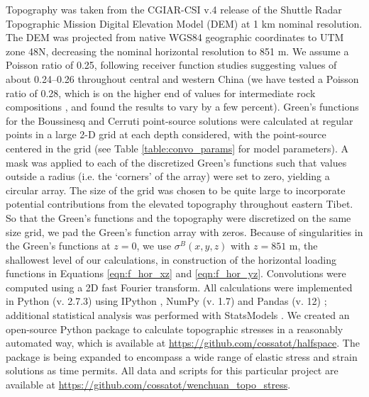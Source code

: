 \documentclass[draft,jgrga]{AGUTeX}
\begin{document}
\begin{article}
Topography was taken from the CGIAR-CSI v.4 release
\citep{jarvis2008srtm} of the Shuttle Radar Topographic Mission
\citep{farr2007srtm} Digital Elevation Model (DEM) at 1 km nominal
resolution. The DEM was projected from native WGS84 geographic
coordinates to UTM zone 48N, decreasing the nominal horizontal
resolution to 851 m. We assume a Poisson ratio of 0.25, following
receiver function studies suggesting values of about 0.24--0.26 throughout
central and western China \citep{chen2010receiverfn} (we have tested a Poisson
ratio of 0.28, which is on the higher end of values for intermediate rock
compositions \citep{zandtammon1995}, and found the results to vary by a few
percent). Green's
functions for the Boussinesq and Cerruti point-source solutions were
calculated at regular points in a large 2-D grid at each depth
considered, with the point-source centered in the grid (see Table
\ref{table:convo_params} for model parameters). A mask was applied to
each of the discretized Green's functions such that values outside a 
radius (i.e. the `corners' of the array) were set to zero, yielding a
circular array. The size of the
grid was chosen to be quite large to incorporate potential contributions
from the elevated topography throughout eastern Tibet. So that the
Green's functions and the topography were discretized on the same size
grid, we pad the Green's function array with zeros. Because of
singularities in the Green's functions at $z=0$, we use
$\sigma^B(x,y,z)$ with $z=851$ m, the shallowest level of our
calculations, in construction of the horizontal loading functions in
Equations \ref{eqn:f_hor_xz} and \ref{eqn:f_hor_yz}. Convolutions were
computed using a 2D fast Fourier transform. All calculations were
implemented in Python (v. 2.7.3) using IPython \citep{perez2007ipython},
NumPy (v. 1.7) \citep{oliphant2007numpy} and Pandas (v. 12)
\citep{mckinney2010}; additional statistical analysis was performed with
StatsModels \citep{seabold2010}. We created an open-source Python package
to calculate topographic stresses in a reasonably automated way, which
is available at \url{https://github.com/cossatot/halfspace}. The package
is being expanded to encompass a wide range of elastic stress and strain
solutions as time permits. All data and scripts for this particular
project are available at
\url{https://github.com/cossatot/wenchuan\_topo\_stress}.


\end{article}
\end{document}
